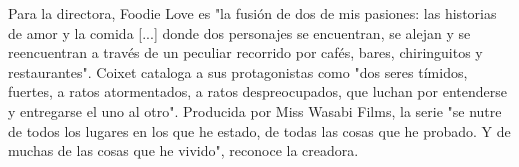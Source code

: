 \documentclass{article}%
\begin{document}
\newline%
%
Para la directora, Foodie Love es "la fusión de dos de mis pasiones: las historias de amor y la comida {[}...{]} donde dos personajes se encuentran, se alejan y se reencuentran a través de un peculiar recorrido por cafés, bares, chiringuitos y restaurantes".%
\newline%
%
Coixet cataloga a sus protagonistas como "dos seres tímidos, fuertes, a ratos atormentados, a ratos despreocupados, que luchan por entenderse y entregarse el uno al otro".%
\newline%
%
Producida por Miss Wasabi Films, la serie "se nutre de todos los lugares en los que he estado, de todas las cosas que he probado. Y de muchas de las cosas que he vivido", reconoce la creadora.%
\newline%
%
\end{document}
